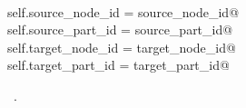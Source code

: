 \documentclass[
    a4paper,      %
    10pt,         %
    openright,    %
    notitlepage,  %
    parskip=half, %
]{scrreprt}       %
\theoremstyle{definition}                    %
\begin{document}
\begin{flushleft}
\begin{minipage}{\linewidth}
\begin{list}{}{}
\mbox{}\lstinline@@\\
\mbox{}\lstinline@        self.source_node_id = source_node_id@\\
\mbox{}\lstinline@        self.source_part_id = source_part_id@\\
\mbox{}\lstinline@        self.target_node_id = target_node_id@\\
\mbox{}\lstinline@        self.target_part_id = target_part_id@{\NWsep}
\end{list}
\vspace{-1.5ex}
\footnotesize
\begin{list}{}{\setlength{\itemsep}{-\parsep}\setlength{\itemindent}{-\leftmargin}}
\item \NWtxtMacroRefIn\ .

\item{}
\end{list}
\end{minipage}\vspace{4ex}
\end{flushleft}
\end{document}
